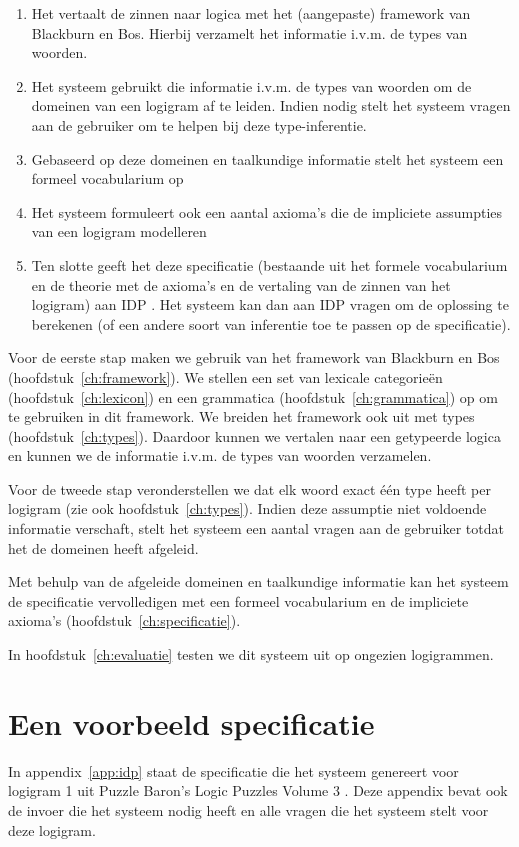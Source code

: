 \begin{enumerate}
  \item Het vertaalt de zinnen naar logica met het (aangepaste) framework van Blackburn en Bos. Hierbij verzamelt het informatie i.v.m. de types van woorden.
  \item Het systeem gebruikt die informatie i.v.m. de types van woorden om de domeinen van een logigram af te leiden. Indien nodig stelt het systeem vragen aan de gebruiker om te helpen bij deze type-inferentie.
  \item Gebaseerd op deze domeinen en taalkundige informatie stelt het systeem een formeel vocabularium op
  \item Het systeem formuleert ook een aantal axioma's die de impliciete assumpties van een logigram modelleren
  \item Ten slotte geeft het deze specificatie (bestaande uit het formele vocabularium en de theorie met de axioma's en de vertaling van de zinnen van het logigram) aan IDP \cite{IDP}. Het systeem kan dan aan IDP vragen om de oplossing te berekenen (of een andere soort van inferentie toe te passen op de specificatie).
\end{enumerate}

Voor de eerste stap maken we gebruik van het framework van Blackburn en Bos (hoofdstuk~\ref{ch:framework}). We stellen een set van lexicale categorieën (hoofdstuk~\ref{ch:lexicon}) en een grammatica (hoofdstuk~\ref{ch:grammatica}) op om te gebruiken in dit framework. We breiden het framework ook uit met types (hoofdstuk~\ref{ch:types}). Daardoor kunnen we vertalen naar een getypeerde logica en kunnen we de informatie i.v.m. de types van woorden verzamelen.

Voor de tweede stap veronderstellen we dat elk woord exact één type heeft per logigram (zie ook hoofdstuk~\ref{ch:types}). Indien deze assumptie niet voldoende informatie verschaft, stelt het systeem een aantal vragen aan de gebruiker totdat het de domeinen heeft afgeleid. 

Met behulp van de afgeleide domeinen en taalkundige informatie kan het systeem de specificatie vervolledigen met een formeel vocabularium en de impliciete axioma's (hoofdstuk~\ref{ch:specificatie}).

In hoofdstuk~\ref{ch:evaluatie} testen we dit systeem uit op ongezien logigrammen. 

\section{Een voorbeeld specificatie}
In appendix~\ref{app:idp} staat de specificatie die het systeem genereert voor logigram 1 uit Puzzle Baron's Logic Puzzles Volume 3 \cite{logigrammen}. Deze appendix bevat ook de invoer die het systeem nodig heeft en alle vragen die het systeem stelt voor deze logigram.
